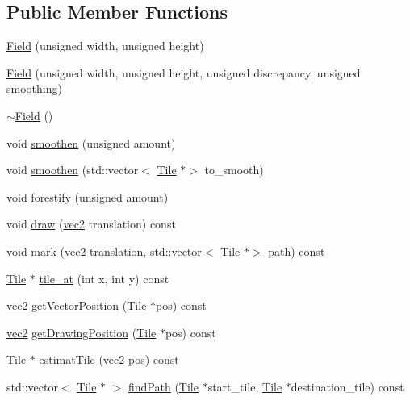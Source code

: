 \subsection*{Public Member Functions}
\begin{DoxyCompactItemize}
\item 
\hyperlink{classField_ace906b0a3a8057fd29feb3208738da8b}{Field} (unsigned width, unsigned height)
\item 
\hyperlink{classField_a8f32e3182de753297bf48cbf81266fa0}{Field} (unsigned width, unsigned height, unsigned discrepancy, unsigned smoothing)
\item 
\hyperlink{classField_a45d6e6d09b8f8e46de62b40119d62c60}{$\sim$\+Field} ()
\item 
void \hyperlink{classField_a7f7717afdf36e1c572743645215b09ad}{smoothen} (unsigned amount)
\item 
void \hyperlink{classField_ac4e988bd9aa40e2821d43576907abe81}{smoothen} (std\+::vector$<$ \hyperlink{classTile}{Tile} $\ast$$>$ to\+\_\+smooth)
\item 
void \hyperlink{classField_aa4550e9ebc14ccaa6d1e3e110906c9b9}{forestify} (unsigned amount)
\item 
void \hyperlink{classField_a6ba5bccf334f6022710acb5a4bbe5e09}{draw} (\hyperlink{structvec2}{vec2} translation) const
\item 
void \hyperlink{classField_a908ce6baa14bf69944f63caed4032a8a}{mark} (\hyperlink{structvec2}{vec2} translation, std\+::vector$<$ \hyperlink{classTile}{Tile} $\ast$$>$ path) const
\item 
\hyperlink{classTile}{Tile} $\ast$ \hyperlink{classField_aa31d2b14e58becf8741a3b4dc19ecc52}{tile\+\_\+at} (int x, int y) const
\item 
\hyperlink{structvec2}{vec2} \hyperlink{classField_a361bc41ed73bb361ee84c390a9f9c0d0}{get\+Vector\+Position} (\hyperlink{classTile}{Tile} $\ast$pos) const
\item 
\hyperlink{structvec2}{vec2} \hyperlink{classField_aab4e4dfa665fb94c158e1902f1bd46c1}{get\+Drawing\+Position} (\hyperlink{classTile}{Tile} $\ast$pos) const
\item 
\hyperlink{classTile}{Tile} $\ast$ \hyperlink{classField_a8068a7e61bc891b1e4cf7d4d9d7afd12}{estimat\+Tile} (\hyperlink{structvec2}{vec2} pos) const
\item 
std\+::vector$<$ \hyperlink{classTile}{Tile} $\ast$ $>$ \hyperlink{classField_a0e5a676ab734632e575513491f049330}{find\+Path} (\hyperlink{classTile}{Tile} $\ast$start\+\_\+tile, \hyperlink{classTile}{Tile} $\ast$destination\+\_\+tile) const

\end{DoxyCompactItemize}
